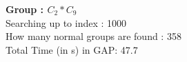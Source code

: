 \textbf{Group : $C_2*C_9$}\\
Searching up to index : 1000\\
How many normal groups are found : 358\\
Total Time (in s) in GAP: 47.7\\
